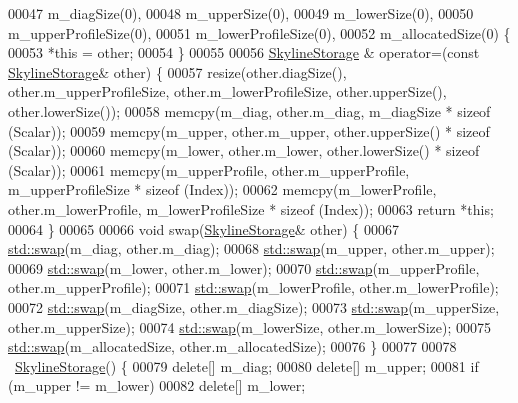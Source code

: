 \begin{DoxyCode}
00047     m\_diagSize(0),
00048     m\_upperSize(0),
00049     m\_lowerSize(0),
00050     m\_upperProfileSize(0),
00051     m\_lowerProfileSize(0),
00052     m\_allocatedSize(0) \{
00053         *\textcolor{keyword}{this} = other;
00054     \}
00055 
00056     \hyperlink{class_eigen_1_1_skyline_storage}{SkylineStorage} & operator=(\textcolor{keyword}{const} \hyperlink{class_eigen_1_1_skyline_storage}{SkylineStorage}& other) \{
00057         resize(other.diagSize(), other.m\_upperProfileSize, other.m\_lowerProfileSize, other.upperSize(), 
      other.lowerSize());
00058         memcpy(m\_diag, other.m\_diag, m\_diagSize * sizeof (Scalar));
00059         memcpy(m\_upper, other.m\_upper, other.upperSize() * \textcolor{keyword}{sizeof} (Scalar));
00060         memcpy(m\_lower, other.m\_lower, other.lowerSize() * \textcolor{keyword}{sizeof} (Scalar));
00061         memcpy(m\_upperProfile, other.m\_upperProfile, m\_upperProfileSize * sizeof (Index));
00062         memcpy(m\_lowerProfile, other.m\_lowerProfile, m\_lowerProfileSize * sizeof (Index));
00063         \textcolor{keywordflow}{return} *\textcolor{keyword}{this};
00064     \}
00065 
00066     \textcolor{keywordtype}{void} swap(\hyperlink{class_eigen_1_1_skyline_storage}{SkylineStorage}& other) \{
00067         \hyperlink{endian_8c_a3ca5ecd34b04d6a243c054ac3a57f68d}{std::swap}(m\_diag, other.m\_diag);
00068         \hyperlink{endian_8c_a3ca5ecd34b04d6a243c054ac3a57f68d}{std::swap}(m\_upper, other.m\_upper);
00069         \hyperlink{endian_8c_a3ca5ecd34b04d6a243c054ac3a57f68d}{std::swap}(m\_lower, other.m\_lower);
00070         \hyperlink{endian_8c_a3ca5ecd34b04d6a243c054ac3a57f68d}{std::swap}(m\_upperProfile, other.m\_upperProfile);
00071         \hyperlink{endian_8c_a3ca5ecd34b04d6a243c054ac3a57f68d}{std::swap}(m\_lowerProfile, other.m\_lowerProfile);
00072         \hyperlink{endian_8c_a3ca5ecd34b04d6a243c054ac3a57f68d}{std::swap}(m\_diagSize, other.m\_diagSize);
00073         \hyperlink{endian_8c_a3ca5ecd34b04d6a243c054ac3a57f68d}{std::swap}(m\_upperSize, other.m\_upperSize);
00074         \hyperlink{endian_8c_a3ca5ecd34b04d6a243c054ac3a57f68d}{std::swap}(m\_lowerSize, other.m\_lowerSize);
00075         \hyperlink{endian_8c_a3ca5ecd34b04d6a243c054ac3a57f68d}{std::swap}(m\_allocatedSize, other.m\_allocatedSize);
00076     \}
00077 
00078     ~\hyperlink{class_eigen_1_1_skyline_storage}{SkylineStorage}() \{
00079         \textcolor{keyword}{delete}[] m\_diag;
00080         \textcolor{keyword}{delete}[] m\_upper;
00081         \textcolor{keywordflow}{if} (m\_upper != m\_lower)
00082             \textcolor{keyword}{delete}[] m\_lower;

\end{DoxyCode}
